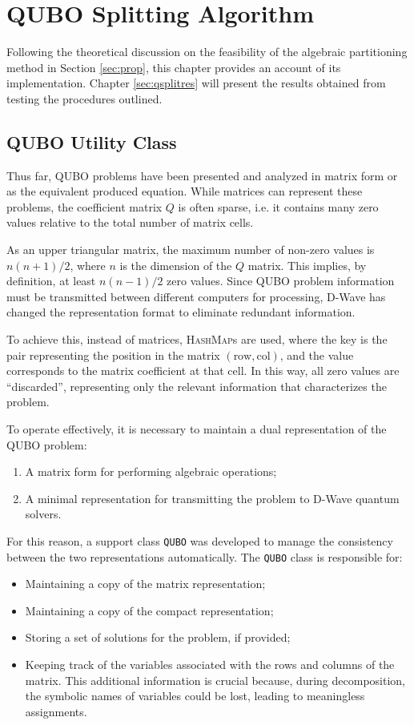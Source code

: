 \chapter{QUBO Splitting Algorithm}

Following the theoretical discussion on the feasibility of the algebraic partitioning method in Section \ref{sec:prop}, this chapter provides an account of its implementation. 
Chapter \ref{sec:qsplitres} will present the results obtained from testing the procedures outlined.

\section{QUBO Utility Class}

Thus far, QUBO problems have been presented and analyzed in matrix form or as the equivalent produced equation. 
While matrices can represent these problems, the coefficient matrix $Q$ is often sparse, i.e. it contains many zero values relative to the total number of matrix cells.

As an upper triangular matrix, the maximum number of non-zero values is $n(n+1)/2$, where $n$ is the dimension of the $Q$ matrix. 
This implies, by definition, at least $n(n-1)/2$ zero values. Since QUBO problem information must be transmitted between different computers for processing, D-Wave has changed the representation format to eliminate redundant information.

To achieve this, instead of matrices, \textsc{HashMap}s are used, where the key is the pair representing the position in the matrix $(\text{row}, \text{col})$, and the value corresponds to the matrix coefficient at that cell. 
In this way, all zero values are ``discarded'', representing only the relevant information that characterizes the problem.

To operate effectively, it is necessary to maintain a dual representation of the QUBO problem: 
\begin{enumerate} 
	\item A matrix form for performing algebraic operations; 
	\item A minimal representation for transmitting the problem to D-Wave quantum solvers. 
\end{enumerate}

For this reason, a support class \texttt{QUBO} was developed to manage the consistency between the two representations automatically. 
The \texttt{QUBO} class is responsible for: 
\begin{itemize} 
	\item Maintaining a copy of the matrix representation; 
	\item Maintaining a copy of the compact representation; 
	\item Storing a set of solutions for the problem, if provided; 
	\item Keeping track of the variables associated with the rows and col\-umns of the matrix. 
    This additional information is crucial because, during decomposition, the symbolic names of variables could be lost, leading to meaningless assignments.
\end{itemize}

